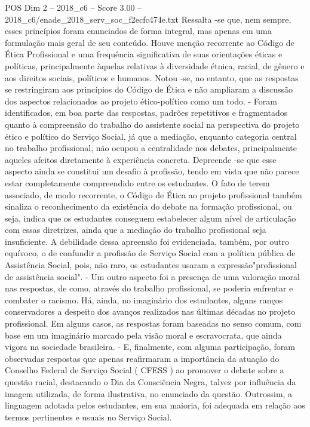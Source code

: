 \begin{textsample}{POS Dim 2 – 2018\_c6 – Score 3.00 – 2018\_c6/enade\_2018\_serv\_soc\_f2ecfc474e.txt}
Ressalta -se que, nem sempre, esses princípios foram enunciados de forma integral, mas apenas em uma formulação mais geral de seu conteúdo.
Houve menção recorrente ao Código de Ética Profissional e uma frequência significativa de suas orientações éticas e políticas, principalmente àquelas relativas à diversidade étnica, racial, de gênero e aos direitos sociais, políticos e humanos.
Notou -se, no entanto, que as respostas se restringiram aos princípios do Código de Ética e não ampliaram a discussão dos aspectos relacionados ao projeto ético-político como um todo. - Foram identificados, em boa parte das respostas, padrões repetitivos e fragmentados quanto à compreensão do trabalho do assistente social na perspectiva do projeto ético e político do Serviço Social, já que a mediação, enquanto categoria central no trabalho profissional, não ocupou a centralidade nos debates, principalmente aqueles afeitos diretamente à experiência concreta.
Depreende -se que esse aspecto ainda se constitui um desafio à profissão, tendo em vista que não parece estar completamente compreendido entre os estudantes.
O fato de terem associado, de modo recorrente, o Código de Ética ao projeto profissional também sinaliza o reconhecimento da existência do debate na formação profissional, ou seja, indica que os estudantes conseguem estabelecer algum nível de articulação com essas diretrizes, ainda que a mediação do trabalho profissional seja insuficiente.
A debilidade dessa apreensão foi evidenciada, também, por outro equívoco, o de confundir a profissão de Serviço Social com a política pública de Assistência Social, pois, não raro, os estudantes usaram a expressão"profissional de assistência social". - Um outro aspecto foi a presença de uma valoração moral nas respostas, de como, através do trabalho profissional, se poderia enfrentar e combater o racismo.
Há, ainda, no imaginário dos estudantes, alguns ranços conservadores a despeito dos avanços realizados nas últimas décadas no projeto profissional.
Em alguns casos, as respostas foram baseadas no senso comum, com base em um imaginário marcado pela visão moral e escravocrata, que ainda vigora na sociedade brasileira. - E, finalmente, com alguma participação, foram observadas respostas que apenas reafirmaram a importância da atuação do Conselho Federal de Serviço Social ( CFESS ) ao promover o debate sobre a questão racial, destacando o Dia da Consciência Negra, talvez por influência da imagem utilizada, de forma ilustrativa, no enunciado da questão.
Outrossim, a linguagem adotada pelos estudantes, em sua maioria, foi adequada em relação aos termos pertinentes e usuais no Serviço Social.

\end{textsample}
